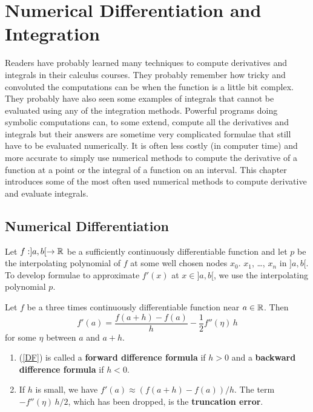 \chapter{Numerical Differentiation and Integration}\label{chaptDiffInt}

Readers have probably learned many techniques to compute derivatives
and integrals in their calculus courses.  They probably remember how
tricky and convoluted the computations can be when the function is a
little bit complex.  They probably have also seen some examples of
integrals that cannot be evaluated using any of the integration methods.
Powerful programs doing symbolic computations can, to some extend,
compute all the derivatives and integrals but their answers are
sometime very complicated formulae that still have to be evaluated 
numerically.  It is often less costly (in computer time) and more
accurate to simply use numerical methods to compute the derivative of
a function at a point or the integral of a function on an interval.   
This chapter introduces some of the most often used numerical methods
to compute derivative and evaluate integrals.

\section{Numerical Differentiation}

Let $f:]a,b[\rightarrow \mathbb{R}$ be a sufficiently continuously
differentiable function and let $p$ be the interpolating 
polynomial of $f$ at some well chosen nodes $x_0$. $x_1$, \ldots,
$x_n$ in $]a,b[$.  To develop formulae to approximate $f'(x)$ at
$x\in ]a,b[$, we use the interpolating polynomial $p$.

\begin{theorem}
Let $f$ be a three times continuously differentiable function near
$a \in \mathbb{R}$.  Then
\begin{equation} \label{DF}
f'(a) = \frac{f(a + h) - f(a)}{h} - \frac{1}{2}f''(\eta)\,h
\end{equation}
for some $\eta$ between $a$ and $a+h$.
\end{theorem}

\begin{rmkList}
\begin{enumerate}
\item (\ref{DF}) is called a
{\bfseries forward difference formula} if
$h > 0$ and a
{\bfseries backward difference formula}
if $h < 0$.
\item If $h$ is small, we have $f'(a) \approx (f(a + h) - f(a))/h$.  The term
$-f''(\eta)\,h/2$, which has been dropped, is the
{\bfseries truncation error}.
\end{enumerate}
\end{rmkList}

